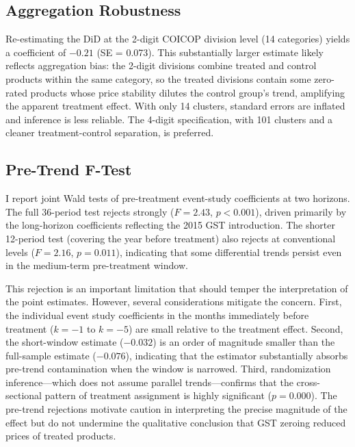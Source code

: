 \documentclass[12pt]{article}
\begin{document}
\subsection{Aggregation Robustness}

Re-estimating the DiD at the 2-digit COICOP division level (14 categories) yields a coefficient of $-0.21$ (SE = 0.073). This substantially larger estimate likely reflects aggregation bias: the 2-digit divisions combine treated and control products within the same category, so the treated divisions contain some zero-rated products whose price stability dilutes the control group's trend, amplifying the apparent treatment effect. With only 14 clusters, standard errors are inflated and inference is less reliable. The 4-digit specification, with 101 clusters and a cleaner treatment-control separation, is preferred.

\subsection{Pre-Trend F-Test}

I report joint Wald tests of pre-treatment event-study coefficients at two horizons. The full 36-period test rejects strongly ($F = 2.43$, $p < 0.001$), driven primarily by the long-horizon coefficients reflecting the 2015 GST introduction. The shorter 12-period test (covering the year before treatment) also rejects at conventional levels ($F = 2.16$, $p = 0.011$), indicating that some differential trends persist even in the medium-term pre-treatment window.

This rejection is an important limitation that should temper the interpretation of the point estimates. However, several considerations mitigate the concern. First, the individual event study coefficients in the months immediately before treatment ($k = -1$ to $k = -5$) are small relative to the treatment effect. Second, the short-window estimate ($-0.032$) is an order of magnitude smaller than the full-sample estimate ($-0.076$), indicating that the estimator substantially absorbs pre-trend contamination when the window is narrowed. Third, randomization inference---which does not assume parallel trends---confirms that the cross-sectional pattern of treatment assignment is highly significant ($p = 0.000$). The pre-trend rejections motivate caution in interpreting the precise magnitude of the effect but do not undermine the qualitative conclusion that GST zeroing reduced prices of treated products.


\end{document}
